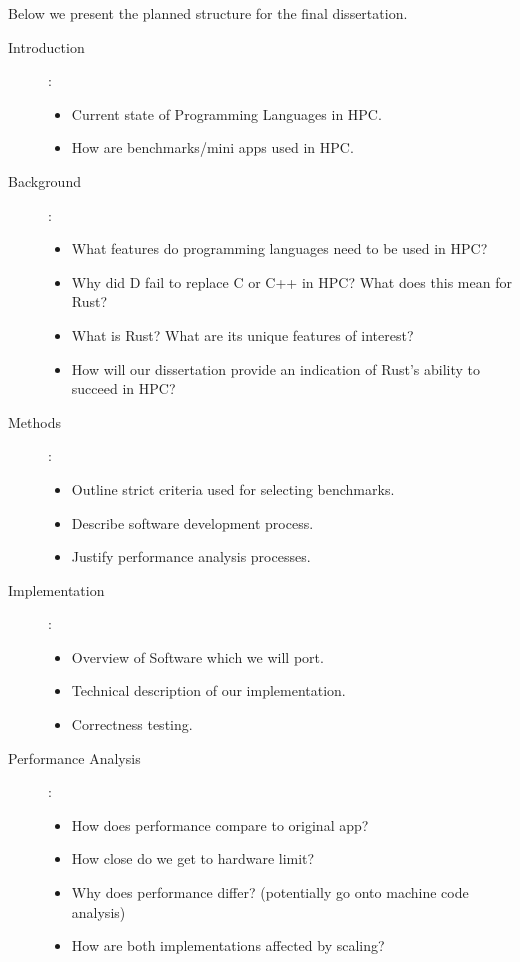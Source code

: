 \documentclass{report}[a4]
\begin{document}
Below we present the planned structure for the final dissertation.
\begin{description}
  \item[Introduction]:
  \begin{itemize}
    \item Current state of Programming Languages in HPC.
    \item How are benchmarks/mini apps used in HPC.
  \end{itemize}
  \item[Background]:
    \begin{itemize}
    \item What features do programming languages need to be used in HPC?
    \item Why did D fail to replace C or C++ in HPC? What does this mean for Rust?
    \item What is Rust? What are its unique features of interest?
    \item How will our dissertation provide an indication of Rust's ability to succeed in HPC?
  \end{itemize}
  \item[Methods]:
\begin{itemize}
    \item Outline strict criteria used for selecting benchmarks.
    \item Describe software development process.
    \item Justify performance analysis processes.
  \end{itemize}
  \item[Implementation]:
  \begin{itemize}
    \item Overview of Software which we will port.
    \item Technical description of our implementation.
    \item Correctness testing.
  \end{itemize}
  \item[Performance Analysis]:
  \begin{itemize}
    \item How does performance compare to original app?
    \item How close do we get to hardware limit?
    \item Why does performance differ? (potentially go onto machine code analysis)
    \item How are both implementations affected by scaling?
  \end{itemize}

\end{description}
\end{document}
